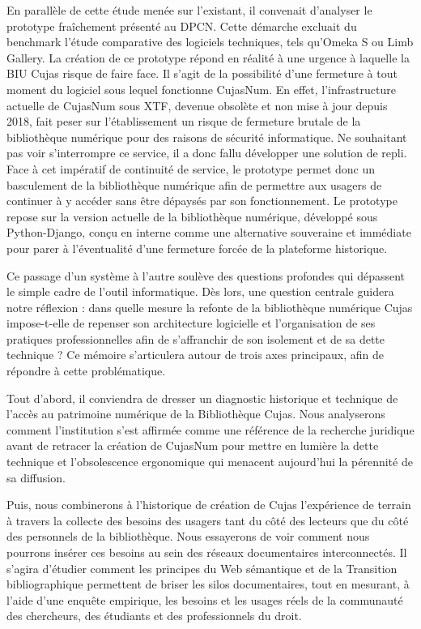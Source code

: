 En parallèle de cette étude menée sur l'existant, il convenait d'analyser le prototype fraîchement présenté au \ac{DPCN}. Cette démarche excluait du benchmark l'étude comparative des logiciels techniques, tels qu'Omeka S ou Limb Gallery. La création de ce prototype répond en réalité à une urgence à laquelle la \ac{BIU Cujas} risque de faire face. Il s'agit de la possibilité d'une fermeture à tout moment du logiciel sous lequel fonctionne CujasNum. En effet, l'infrastructure actuelle de CujasNum sous \ac{XTF}, devenue obsolète et non mise à jour depuis 2018, fait peser sur l'établissement un risque de fermeture brutale de la bibliothèque numérique pour des raisons de sécurité informatique. Ne souhaitant pas voir s'interrompre ce service, il a donc fallu développer une solution de repli. Face à cet impératif de continuité de service, le prototype permet donc un basculement de la bibliothèque numérique afin de permettre aux usagers de continuer à y accéder sans être dépaysés par son fonctionnement. Le prototype repose sur la version actuelle de la bibliothèque numérique, développé sous Python-Django, conçu en interne comme une alternative souveraine et immédiate pour parer à l'éventualité d'une fermeture forcée de la plateforme historique.
\medskip

Ce passage d'un système à l'autre soulève des questions profondes qui dépassent le simple cadre de l'outil informatique. Dès lors, une question centrale guidera notre réflexion : dans quelle mesure la refonte de la bibliothèque numérique Cujas impose-t-elle de repenser son architecture logicielle et l'organisation de ses pratiques professionnelles afin de s'affranchir de son isolement et de sa dette technique ?
Ce mémoire s’articulera autour de trois axes principaux, afin de répondre à cette problématique.

Tout d'abord, il conviendra de dresser un diagnostic historique et technique de l’accès au patrimoine numérique de la Bibliothèque Cujas. Nous analyserons comment l’institution s’est affirmée comme une référence de la recherche juridique avant de retracer la création de CujasNum pour mettre en lumière la dette technique et l'obsolescence ergonomique qui menacent aujourd’hui la pérennité de sa diffusion.

Puis, nous combinerons à l'historique de création  de Cujas l'expérience de terrain à travers la collecte des besoins des usagers tant du côté des lecteurs que du côté des personnels de la bibliothèque. Nous essayerons de voir comment nous pourrons insérer ces besoins au sein des réseaux documentaires interconnectés. Il s'agira d'étudier comment les principes du Web sémantique et de la Transition bibliographique permettent de briser les silos documentaires, tout en mesurant, à l'aide d'une enquête empirique, les besoins et les usages réels de la communauté des chercheurs, des étudiants et des professionnels du droit.

